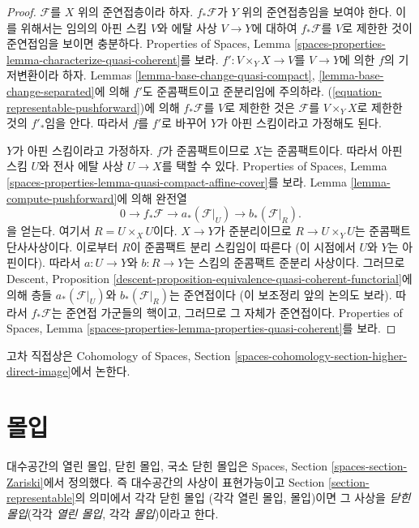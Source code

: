 \begin{proof}
$\mathcal{F}$를 $X$ 위의 준연접층이라 하자.
$f_*\mathcal{F}$가 $Y$ 위의 준연접층임을 보여야 한다.
이를 위해서는 임의의 아핀 스킴 $V$와 에탈 사상 $V \to Y$에 대하여
$f_*\mathcal{F}$를 $V$로 제한한 것이 준연접임을 보이면 충분하다.
Properties of Spaces, Lemma
\ref{spaces-properties-lemma-characterize-quasi-coherent}를 보라.
$f' : V \times_Y X \to V$를 $V \to Y$에 의한 $f$의 기저변환이라 하자.
Lemmas \ref{lemma-base-change-quasi-compact},
\ref{lemma-base-change-separated}에 의해 $f'$도 준콤팩트이고
준분리임에 주의하라. (\ref{equation-representable-pushforward})에 의해
$f_*\mathcal{F}$를 $V$로 제한한 것은 $\mathcal{F}$를
$V \times_Y X$로 제한한 것의 $f'_*$임을 안다.
따라서 $f$를 $f'$로 바꾸어 $Y$가 아핀 스킴이라고 가정해도 된다.

\medskip\noindent
$Y$가 아핀 스킴이라고 가정하자. $f$가 준콤팩트이므로 $X$는
준콤팩트이다. 따라서 아핀 스킴 $U$와 전사 에탈 사상 $U \to X$를
택할 수 있다. Properties of Spaces, Lemma
\ref{spaces-properties-lemma-quasi-compact-affine-cover}를 보라.
Lemma \ref{lemma-compute-pushforward}에 의해 완전열
$$
0 \to f_*\mathcal{F} \to a_*(\mathcal{F}|_U) \to b_*(\mathcal{F}|_R).
$$
을 얻는다. 여기서 $R = U \times_X U$이다.
$X \to Y$가 준분리이므로
$R \to U \times_Y U$는 준콤팩트 단사사상이다.
이로부터 $R$이 준콤팩트 분리 스킴임이 따른다
(이 시점에서 $U$와 $Y$는 아핀이다).
따라서 $a : U \to Y$와 $b : R \to Y$는 스킴의 준콤팩트 준분리
사상이다. 그러므로 Descent, Proposition
\ref{descent-proposition-equivalence-quasi-coherent-functorial}에 의해
층들 $a_*(\mathcal{F}|_U)$와 $b_*(\mathcal{F}|_R)$는 준연접이다
(이 보조정리 앞의 논의도 보라). 따라서 $f_*\mathcal{F}$는 준연접
가군들의 핵이고, 그러므로 그 자체가 준연접이다.
Properties of Spaces, Lemma
\ref{spaces-properties-lemma-properties-quasi-coherent}를 보라.
\end{proof}

\noindent
고차 직접상은 Cohomology of Spaces, Section
\ref{spaces-cohomology-section-higher-direct-image}에서 논한다.









\section{몰입}
\label{section-immersions}

\noindent
대수공간의 열린 몰입, 닫힌 몰입, 국소 닫힌 몰입은
Spaces, Section \ref{spaces-section-Zariski}에서 정의했다.
즉 대수공간의 사상이 표현가능이고
Section \ref{section-representable}의 의미에서 각각 닫힌 몰입
(각각 열린 몰입, 몰입)이면 그 사상을
{\it 닫힌 몰입}(각각 {\it 열린 몰입}, 각각 {\it 몰입})이라고 한다.

